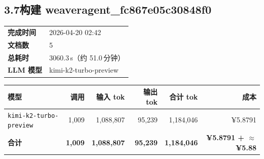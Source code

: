 \documentclass[11pt]{article}
\begin{document}
\subsection*{3.7\;构建 weaveragent\_fc867e05c30848f0}
\noindent\begin{minipage}{\textwidth}
\begin{tabular}{@{}ll@{}}
\textbf{完成时间} & 2026-04-20 02:42 \\
\textbf{文档数} & 5 \\
\textbf{总耗时} & 3060.3\,s（约 51.0\,分钟） \\
\textbf{LLM 模型} & kimi-k2-turbo-preview \\
\end{tabular}
\end{minipage}
\par\vspace{0.25cm}
\noindent\begin{tabularx}{\textwidth}{@{}X r r r r r@{}}
\toprule
\rowcolor{headerbg!10}\textbf{模型} & \textbf{调用} & \textbf{输入 tok} & \textbf{输出 tok} & \textbf{合计 tok} & \textbf{成本} \\
\midrule
\rowcolor{rowalt}\texttt{\small kimi-k2-turbo-preview} & 1{,}009 & 1{,}088{,}807 & 95{,}239 & 1{,}184{,}046 & ¥5.8791 \\
\midrule
\rowcolor{headerbg!15}\textbf{合计} & \textbf{1{,}009} & \textbf{1{,}088{,}807} & \textbf{95{,}239} & \textbf{1{,}184{,}046} & \textbf{¥5.8791 + $\approx$ ¥5.88} \\
\bottomrule
\end{tabularx}
\vspace{0.5cm}
\end{document}
